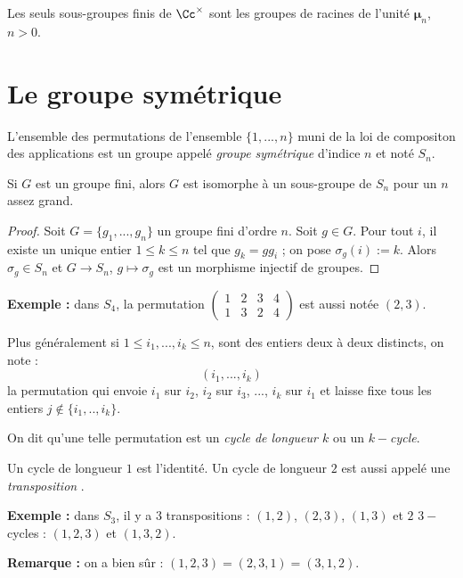\documentclass[class=report,crop=false]{standalone}
\begin{document}
\begin{exercicecours}
Les seuls sous-groupes finis de $\Cc^\times$ sont les groupes de racines de l'unité $\mathbf{\mu}_n$, $n >0$.
\end{exercicecours}

\section{Le groupe symétrique}

L'ensemble des permutations de l'ensemble $\{1,...,n\}$ muni de la loi de compositon des applications est un groupe appelé {\it groupe symétrique} d'indice $n$ et noté $S_n$.

\begin{proposition}
Si $G$ est un groupe fini, alors $G$ est isomorphe à un sous-groupe de $S_n$ pour un $n$ assez grand.
\end{proposition}

\begin{proof}
Soit $G=\{g_1,...,g_n\}$ un groupe fini d'ordre $n$. Soit $g \in G$. Pour tout $i$, il existe un unique entier $1 \le k \le n$ tel que $g_k = gg_i$ ; on pose $\sigma_g(i):=k$. Alors $\sigma_g \in S_n$ et $G \to S_n$, $g \mapsto \sigma_g$ est un morphisme injectif de groupes. 
\end{proof}

{\bf Exemple :} dans $S_4$, la permutation $\left(\begin{array}{cccc}
1&2&3&4\\
1&3&2&4
\end{array}\right)$ est aussi notée $(2,3)$.


Plus généralement si $1 \le i_1,...,i_k\le n$, sont des entiers deux à deux distincts, on note :
\[(i_1,...,i_k)\]
la permutation qui envoie $i_1$ sur $i_2$, $i_2$ sur $i_3$, ..., $i_k$ sur $i_1$ et laisse fixe tous les entiers $j \not\in \{i_1,..,i_k\}$.


On dit qu'une telle permutation est un {\it cycle de longueur $k$} ou un {\it $k-$cycle}.

Un cycle de longueur $1$ est l'identité. Un cycle de longueur $2$ est aussi appelé une {\it transposition} .

{\bf Exemple :} dans $S_3$, il y a $3$ transpositions : $(1,2)$, $(2,3)$, $(1,3)$ et $2$ $3-$cycles : $(1,2,3)$ et $(1,3,2)$.

{\bf Remarque :} on a bien sûr : $(1,2,3) = (2,3,1) = (3,1,2)$.
\end{document}
